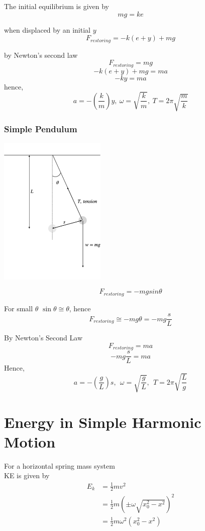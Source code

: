 \documentclass[a4paper, 10pt]{article}
\begin{document}
The initial equilibrium is given by
\[
mg = ke
\]

when displaced by an initial $y$ 
\[
   F_{restoring} = -k(e+y) + mg
\]

by Newton's second law
\[
   F_{restoring} = mg
\]
\[
-k(e+y) + mg = ma
\]
\[
-ky = ma
\]
hence, 
\[
   a = -\left( \frac{k}{m}\right)y,\ \omega = \sqrt{\frac{k}{m}},\ T = 2\pi \sqrt{\frac{m}{k}}
\]

\subsubsection{Simple Pendulum}
\begin{center}
\includegraphics[trim = 50 50 50 50, width=2in]{figures/3.pdf} 
\end{center}	

\[
   F_{restoring} = -mg sin\theta
\]

For small $\theta$ $\sin \theta \cong \theta$, hence
\[
   F_{restoring} \cong -mg \theta = - mg \frac{s}{L}
\]

By Newton's Second Law
\[
   F_{restoring} = ma
\]
\[
-mg \frac{s}{L} = ma
\]
Hence, 
\[
   a = - \left( \frac{g}{L}\right)s, \ \ \omega = \sqrt{\frac{g}{L}},\ \ T = 2\pi \sqrt{\frac{L}{g}}
\]

\section{Energy in Simple Harmonic Motion}
For a horizontal spring mass system \\
KE is given by
\begin{align*}
   E_k &= \frac{1}{2} mv^2 \\
       &= \frac{1}{2} m \left( \pm \omega \sqrt{x_0^2 - x^2}\right)^2\\
       &= \frac{1}{2} m \omega^2 \left( x_0^2 - x^2\right)
\end{align*}	
\end{document}
